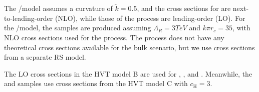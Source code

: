 The \ggF/\VBF\GBulktoWW model assumes a curvature of $\tilde{k}=0.5$, and the cross sections for \ggF\GBulktoWW are next-to-leading-order (NLO), while those of the \VBF process are leading-order (LO).
For the \ggF/\VBF\RadtoWW model, the samples are produced assuming $\Lambda_{R}=3\unit{TeV}$ and $k\pi r_c=35$, with NLO cross sections used for the \ggF process.
The \VBF process does not have any theoretical cross sections available for the bulk scenario, but we use cross sections from a separate RS model.

The LO cross sections in the HVT model B are used for \DY\ZprtoWW, \DY\WprtoWZ, and \DY\WprtoWH.
Meanwhile, the \VBF\ZprtoWW and \DY\WprtoWZ samples use cross sections from the HVT model C with $c_\mathrm{H}=3$.%

\begin{table}[htbp]
  \centering
  
  \caption{
    Samples for each of the nine benchmark signals.
    Here, ``\texttt{[MASS]}'' refers to the mass points for \MX, while ``\texttt{[SUFFIX]}'' refers to various tags denoting the campaign in which the samples were made, such as \texttt{13TeV-madgraph} or \texttt{TuneCP5\_13TeV-madgraph-pythia8}.
  }
  \label{tab:sigSamples}
\end{table}

